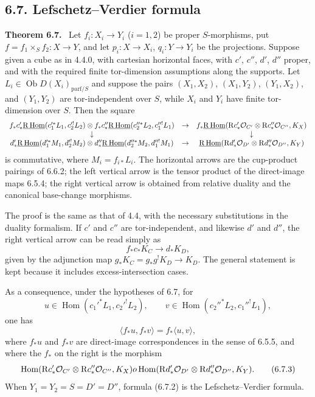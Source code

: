 \documentclass[11pt]{article}
\theoremstyle{plain}
\theoremstyle{definition}
\theoremstyle{remark}
\newenvironment{statement}[1]{\par\medskip\noindent\textbf{#1.}\ }{\par\medskip}
\DeclareMathOperator{\Hom}{Hom}
\DeclareMathOperator{\ob}{Ob}
\newcommand{\R}{\mathrm R}
\begin{document}
\subsection*{6.7. Lefschetz--Verdier formula}
\begin{statement}{Theorem 6.7}
Let $f_i:X_i\to Y_i$ ($i=1,2$) be proper $S$-morphisms, put $f=f_1\times_S f_2:X\to Y$, and let $p_i:X\to X_i$, $q_i:Y\to Y_i$ be the projections. Suppose given a cube as in 4.4.0, with cartesian horizontal faces, with $c'$, $c''$, $d'$, $d''$ proper, and with the required finite tor-dimension assumptions along the supports. Let $L_i\in\ob D(X_i)_{\mathrm{parf}/S}$ and suppose the pairs $(X_1,X_2)$, $(X_1,Y_2)$, $(Y_1,X_2)$, and $(Y_1,Y_2)$ are tor-independent over $S$, while $X_i$ and $Y_i$ have finite tor-dimension over $S$. Then the square
\[
\begin{array}{ccc}
 f_*c'_*\underline{\R\Hom}(c_1'^*L_1,c_2'^!L_2)
 \otimes f_*c''_*\underline{\R\Hom}(c_2''^*L_2,c_1''^!L_1)
 &\to&
 f_*\underline{\R\Hom}(\R c'_*\cO_{C'}\otimes \R c''_*\cO_{C''},K_X)\\
 \downarrow && \downarrow\\
 d'_*\underline{\R\Hom}(d_1'^*M_1,d_2'^!M_2)
 \otimes d''_*\underline{\R\Hom}(d_2''^*M_2,d_1''^!M_1)
 &\to&
 \underline{\R\Hom}(\R d'_*\cO_{D'}\otimes \R d''_*\cO_{D''},K_Y)
\end{array}
\]
is commutative, where $M_i=f_{i*}L_i$. The horizontal arrows are the cup-product pairings of 6.6.2; the left vertical arrow is the tensor product of the direct-image maps 6.5.4; the right vertical arrow is obtained from relative duality and the canonical base-change morphisms.
\end{statement}

The proof is the same as that of 4.4, with the necessary substitutions in the duality formalism. If $c'$ and $c''$ are tor-independent, and likewise $d'$ and $d''$, the right vertical arrow can be read simply as
\[
   f_*c_*K_C\to d_*K_D,
\]
given by the adjunction map $g_*K_C=g_*g^!K_D\to K_D$. The general statement is kept because it includes excess-intersection cases.

As a consequence, under the hypotheses of 6.7, for
\[
   u\in\Hom(c_1'^*L_1,c_2'^!L_2),
   \qquad
   v\in\Hom(c_2''^*L_2,c_1''^!L_1),
\]
one has
\begin{equation}
   \langle f_*u,f_*v\rangle=f_*\langle u,v\rangle,
   \tag{6.7.2}
\end{equation}
where $f_*u$ and $f_*v$ are direct-image correspondences in the sense of 6.5.5, and where the $f_*$ on the right is the morphism
\begin{equation}
\Hom(\R c'_*\cO_{C'}\otimes \R c''_*\cO_{C''},K_X)	o
\Hom(\R d'_*\cO_{D'}\otimes \R d''_*\cO_{D''},K_Y).
\tag{6.7.3}
\end{equation}
When $Y_1=Y_2=S=D'=D''$, formula (6.7.2) is the Lefschetz--Verdier formula.
\end{document}
